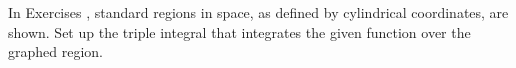 {\noindent In Exercises} 
{,  standard regions in space, as defined by cylindrical coordinates, are shown. Set up the triple integral that integrates the given function over the graphed region.
}
